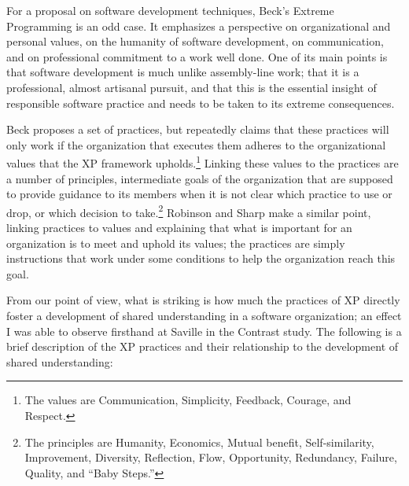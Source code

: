 For a proposal on software development techniques, Beck's Extreme Programming is an odd case. It emphasizes a perspective on organizational and personal values, on the humanity of software development, on communication, and on professional commitment to a work well done. One of its main points is that software development is much unlike assembly-line work; that it is a professional, almost artisanal pursuit, and that this is the essential insight of responsible software practice and needs to be taken to its extreme consequences.

Beck proposes a set of practices, but repeatedly claims that these practices will only work if the organization that executes them adheres to the organizational values that the XP framework upholds.\footnote{The values are Communication, Simplicity, Feedback, Courage, and Respect.} Linking these values to the practices are a number of principles, intermediate goals of the organization that are supposed to provide guidance to its members when it is not clear which practice to use or drop, or which decision to take.\footnote{The principles are Humanity, Economics, Mutual benefit, Self-similarity, Improvement, Diversity, Reflection, Flow, Opportunity, Redundancy, Failure, Quality, and ``Baby Steps.''} Robinson and Sharp  make a similar point, linking practices to values and explaining that what is important for an organization is to meet and uphold its values; the practices are simply instructions that work under some conditions to help the organization reach this goal.

From our point of view, what is striking is how much the practices of XP directly foster a development of shared understanding in a software organization; an effect I was able to observe firsthand at Saville in the Contrast study. The following is a brief description of the XP practices and their relationship to the development of shared understanding:

